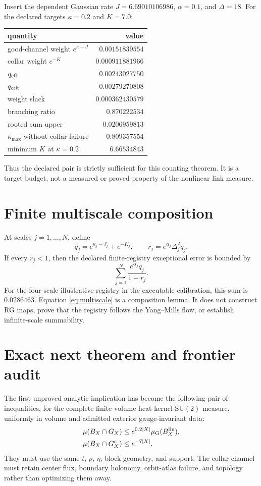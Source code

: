 \documentclass[11pt]{article}
\begin{document}
Insert the dependent Gaussian rate $J=6.69010106986$, $\alpha=0.1$, and
$\Delta=18$.  For the declared targets $\kappa=0.2$ and $K=7.0$:
\begin{center}
\begin{tabular}{@{}lr@{}}
\toprule
quantity & value\\
\midrule
good-channel weight $e^{\kappa-J}$ & $0.00151839554$\\
collar weight $e^{-K}$ & $0.000911881966$\\
$q_{\rm eff}$ & $0.00243027750$\\
$q_{\rm crit}$ & $0.00279270808$\\
weight slack & $0.000362430579$\\
branching ratio & $0.870222534$\\
rooted sum upper & $0.0206959813$\\
$\kappa_{\max}$ without collar failure & $0.809357554$\\
minimum $K$ at $\kappa=0.2$ & $6.66534843$\\
\bottomrule
\end{tabular}
\end{center}
Thus the declared pair is strictly sufficient for this counting theorem.  It
is a target budget, not a measured or proved property of the nonlinear link
measure.

\section{Finite multiscale composition}

At scales $j=1,\ldots,N$, define
\[
 q_j=e^{\kappa_j-J_j}+e^{-K_j},
 \qquad r_j=e^{\alpha_j}\Delta_j^2q_j.
\]
If every $r_j<1$, then the declared finite-registry exceptional error is
bounded by
\begin{equation}
 \sum_{j=1}^N\frac{e^{\alpha_j}q_j}{1-r_j}.
 \label{eq:multiscale}
\end{equation}
For the four-scale illustrative registry in the executable calibration, this
sum is $0.0286463$.  Equation \eqref{eq:multiscale} is a composition lemma.  It
does not construct RG maps, prove that the registry follows the Yang--Mills
flow, or establish infinite-scale summability.

\section{Exact next theorem and frontier audit}

The first unproved analytic implication has become the following pair of inequalities,
for the complete finite-volume heat-kernel $\mathrm{SU}(2)$ measure, uniformly
in volume and admitted exterior gauge-invariant data:
\begin{align*}
 \mu(B_X\cap G_X)&\leq e^{0.2|X|}\mu_{\rm G}(B_X^{\rm lin}),\\
 \mu(B_X\cap G_X^c)&\leq e^{-7|X|}.
\end{align*}
They must use the same $t$, $\rho$, $\eta$, block geometry, and support.  The
collar channel must retain center flux, boundary holonomy, orbit-atlas failure,
and topology rather than optimizing them away.
\end{document}
